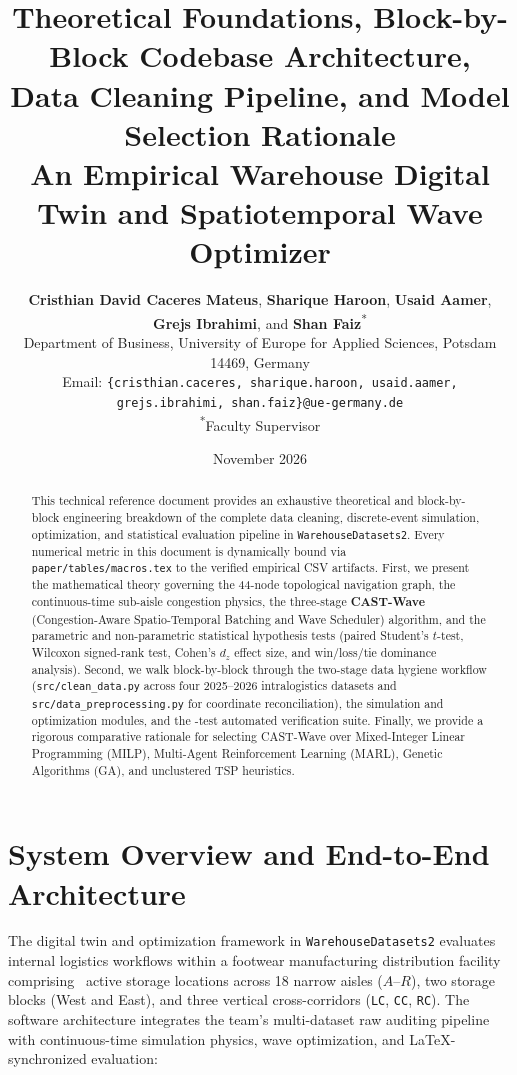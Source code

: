 \documentclass[11pt,a4paper]{article}
\title{\textbf{\LARGE Theoretical Foundations, Block-by-Block Codebase Architecture,\\Data Cleaning Pipeline, and Model Selection Rationale}\\[0.5em]
\large An Empirical Warehouse Digital Twin and Spatiotemporal Wave Optimizer}
\author{\textbf{Cristhian David Caceres Mateus}, \textbf{Sharique Haroon}, \textbf{Usaid Aamer}, \textbf{Grejs Ibrahimi}, and \textbf{Shan Faiz}\textsuperscript{*}\\[0.4em]
\normalsize Department of Business, University of Europe for Applied Sciences, Potsdam 14469, Germany\\
\normalsize Email: \texttt{\{cristhian.caceres, sharique.haroon, usaid.aamer, grejs.ibrahimi, shan.faiz\}@ue-germany.de}\\
\normalsize\textsuperscript{*}Faculty Supervisor}
\date{November 2026}
\begin{document}
\maketitle

\begin{abstract}
This technical reference document provides an exhaustive theoretical and block-by-block engineering breakdown of the complete data cleaning, discrete-event simulation, optimization, and statistical evaluation pipeline in \texttt{WarehouseDatasets2}. Every numerical metric in this document is dynamically bound via \texttt{paper/tables/macros.tex} to the verified empirical CSV artifacts. First, we present the mathematical theory governing the 44-node topological navigation graph, the continuous-time sub-aisle congestion physics, the three-stage \textbf{CAST-Wave} (Congestion-Aware Spatio-Temporal Batching and Wave Scheduler) algorithm, and the parametric and non-parametric statistical hypothesis tests (paired Student's $t$-test, Wilcoxon signed-rank test, Cohen's $d_z$ effect size, and win/loss/tie dominance analysis). Second, we walk block-by-block through the two-stage data hygiene workflow (\texttt{src/clean\_data.py} across four 2025--2026 intralogistics datasets and \texttt{src/data\_preprocessing.py} for coordinate reconciliation), the simulation and optimization modules, and the \AutomatedTestCount-test automated verification suite. Finally, we provide a rigorous comparative rationale for selecting CAST-Wave over Mixed-Integer Linear Programming (MILP), Multi-Agent Reinforcement Learning (MARL), Genetic Algorithms (GA), and unclustered TSP heuristics.
\end{abstract}

\vspace{1em}
\tableofcontents
\newpage

\section{System Overview and End-to-End Architecture}

The digital twin and optimization framework in \texttt{WarehouseDatasets2} evaluates internal logistics workflows within a footwear manufacturing distribution facility comprising \TotalLocations~active storage locations across 18 narrow aisles ($A$--$R$), two storage blocks (West and East), and three vertical cross-corridors (\texttt{LC}, \texttt{CC}, \texttt{RC}). The software architecture integrates the team's multi-dataset raw auditing pipeline with continuous-time simulation physics, wave optimization, and LaTeX-synchronized evaluation:
\end{document}
